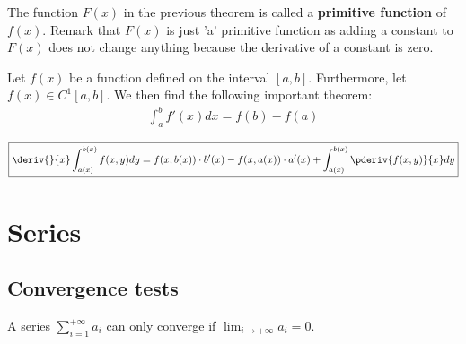         \begin{remark}
		The function $F(x)$ in the previous theorem is called a \textbf{primitive function} of $f(x)$. Remark that $F(x)$ is just 'a' primitive function as adding a constant to $F(x)$ does not change anything because the derivative of a constant is zero.
	\end{remark}
    
    	\begin{theorem}
		Let $f(x)$ be a function defined on the interval $[a, b]$. Furthermore, let $f(x) \in C^1[a, b]$. We then find the following important theorem:
        	\begin{gather}
			\label{calculus:second_fundamental_theorem}
                	\boxed{\int_a^bf'(x)dx = f(b) - f(a)}
		\end{gather}
	\end{theorem}
        
	\begin{theorem}
		\begin{gather}
			\label{calculus:diff_under_integral}
			\boxed{\deriv{}{x}\int_{a(x)}^{b(x)}f(x, y)dy = f(x, b(x))\cdot b'(x) - f(x, a(x))\cdot a'(x) + \int_{a(x)}^{b(x)}\pderiv{f(x, y)}{x}dy}
		\end{gather}
	\end{theorem}

\section{Series}
\subsection{Convergence tests}

	\begin{theorem}
		A series $\sum_{i=1}^{+\infty} a_i$ can only converge if $\lim_{i\rightarrow+\infty} a_i = 0$.
	\end{theorem}

